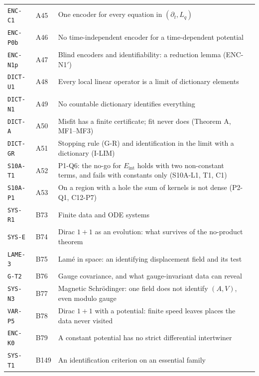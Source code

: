 \documentclass[11pt,a4paper,oneside]{report}
\newcommand{\Eint}{E_{\mathrm{int}}}
\begin{document}
\begin{center}
\begin{longtable}{@{}L{3.6cm}L{1.2cm}L{8.0cm}L{1.2cm}@{}}
\texttt{ENC-C1} & A45 & One encoder for every equation in $(\partial_t,L_q)$ & \pageref{dim:ENC-C1}\\
\texttt{ENC-P0b} & A46 & No time-independent encoder for a time-dependent potential & \pageref{dim:ENC-P0b}\\
\texttt{ENC-N1p} & A47 & Blind encoders and identifiability: a reduction lemma (ENC-N1$'$) & \pageref{dim:ENC-N1p}\\
\texttt{DICT-U1} & A48 & Every local linear operator is a limit of dictionary elements & \pageref{dim:DICT-U1}\\
\texttt{DICT-N1} & A49 & No countable dictionary identifies everything & \pageref{dim:DICT-N1}\\
\texttt{DICT-A} & A50 & Misfit has a finite certificate; fit never does (Theorem A, MF1--MF3) & \pageref{dim:DICT-A}\\
\texttt{DICT-GR} & A51 & Stopping rule (G-R) and identification in the limit with a dictionary (I-LIM) & \pageref{dim:DICT-GR}\\
\texttt{S10A-T1} & A52 & P1-Q6: the no-go for $\Eint$ holds with two non-constant terms, and fails with constants only (S10A-L1, T1, C1) & \pageref{dim:S10A-T1}\\
\texttt{S10A-P1} & A53 & On a region with a hole the sum of kernels is not dense (P2-Q1, C12-P7) & \pageref{dim:S10A-P1}\\
\texttt{SYS-R1} & B73 & Finite data and ODE systems & \pageref{dim:SYS-R1}\\
\texttt{SYS-E} & B74 & Dirac $1+1$ as an evolution: what survives of the no-product theorem & \pageref{dim:SYS-E}\\
\texttt{LAME-3} & B75 & Lam\'e in space: an identifying displacement field and its test & \pageref{dim:LAME-3}\\
\texttt{G-T2} & B76 & Gauge covariance, and what gauge-invariant data can reveal & \pageref{dim:G-T2}\\
\texttt{SYS-N3} & B77 & Magnetic Schr\"odinger: one field does not identify $(A,V)$, even modulo gauge & \pageref{dim:SYS-N3}\\
\texttt{VAR-P5} & B78 & Dirac $1+1$ with a potential: finite speed leaves places the data never visited & \pageref{dim:VAR-P5}\\
\texttt{ENC-K0} & B79 & A constant potential has no strict differential intertwiner & \pageref{dim:ENC-K0}\\
\texttt{SYS-T1} & B149 & An identification criterion on an essential family & \pageref{dim:SYS-T1}\\

\end{longtable}
\end{center}
\end{document}
